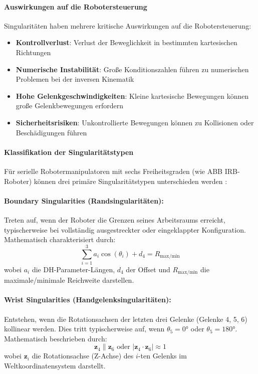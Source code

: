 \paragraph{Auswirkungen auf die Robotersteuerung}
Singularitäten haben mehrere kritische Auswirkungen auf die Robotersteuerung:

\begin{itemize}
    \item \textbf{Kontrollverlust}: Verlust der Beweglichkeit in bestimmten kartesischen Richtungen
    \item \textbf{Numerische Instabilität}: Große Konditionszahlen führen zu numerischen Problemen bei der inversen Kinematik
    \item \textbf{Hohe Gelenkgeschwindigkeiten}: Kleine kartesische Bewegungen können große Gelenkbewegungen erfordern
    \item \textbf{Sicherheitsrisiken}: Unkontrollierte Bewegungen können zu Kollisionen oder Beschädigungen führen
\end{itemize}

\paragraph{Klassifikation der Singularitätstypen}
Für serielle Robotermanipulatoren mit sechs Freiheitsgraden (wie ABB
IRB-Roboter) können drei primäre Singularitätstypen unterschieden werden
\cite{spong2006robot}:

\paragraph{Boundary Singularities (Randsingularitäten):}
Treten auf, wenn der Roboter die Grenzen seines Arbeitsraums erreicht,
typischerweise bei vollständig ausgestreckter oder eingeklappter Konfiguration.
Mathematisch charakterisiert durch:
\begin{equation}
    \sum_{i=1}^{3} a_i \cos(\theta_i) + d_4 = R_{\text{max/min}}
    \label{eq:boundary_singularity}
\end{equation}
wobei $a_i$ die DH-Parameter-Längen, $d_4$ der Offset und $R_{\text{max/min}}$ die maximale/minimale Reichweite darstellen.

\paragraph{Wrist Singularities (Handgelenksingularitäten):}
Entstehen, wenn die Rotationsachsen der letzten drei Gelenke (Gelenke 4, 5, 6)
kollinear werden. Dies tritt typischerweise auf, wenn $\theta_5 = 0°$ oder
$\theta_5 = 180°$. Mathematisch beschrieben durch:
\begin{equation}
    \mathbf{z}_4 \parallel \mathbf{z}_6 \text{ oder } |\mathbf{z}_4 \cdot \mathbf{z}_6| \approx 1
    \label{eq:wrist_singularity}
\end{equation}
wobei $\mathbf{z}_i$ die Rotationsachse (Z-Achse) des $i$-ten Gelenks im Weltkoordinatensystem darstellt.

